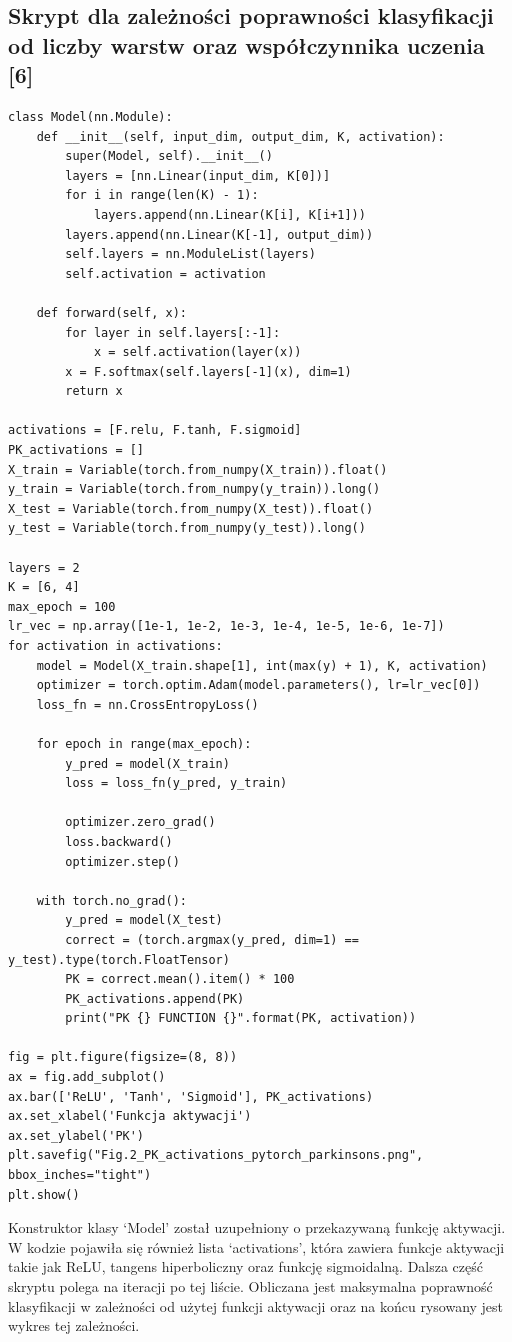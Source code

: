 \documentclass{article}
\begin{document}
\subsection{Skrypt dla zależności poprawności klasyfikacji od liczby warstw oraz współczynnika uczenia [6]}
\begin{verbatim}
class Model(nn.Module):
    def __init__(self, input_dim, output_dim, K, activation):
        super(Model, self).__init__()
        layers = [nn.Linear(input_dim, K[0])]
        for i in range(len(K) - 1):
            layers.append(nn.Linear(K[i], K[i+1]))
        layers.append(nn.Linear(K[-1], output_dim))
        self.layers = nn.ModuleList(layers)
        self.activation = activation

    def forward(self, x):
        for layer in self.layers[:-1]:
            x = self.activation(layer(x))
        x = F.softmax(self.layers[-1](x), dim=1)
        return x

activations = [F.relu, F.tanh, F.sigmoid]
PK_activations = []
X_train = Variable(torch.from_numpy(X_train)).float()
y_train = Variable(torch.from_numpy(y_train)).long()
X_test = Variable(torch.from_numpy(X_test)).float()
y_test = Variable(torch.from_numpy(y_test)).long()

layers = 2
K = [6, 4]
max_epoch = 100
lr_vec = np.array([1e-1, 1e-2, 1e-3, 1e-4, 1e-5, 1e-6, 1e-7])
for activation in activations:
    model = Model(X_train.shape[1], int(max(y) + 1), K, activation)
    optimizer = torch.optim.Adam(model.parameters(), lr=lr_vec[0])
    loss_fn = nn.CrossEntropyLoss()

    for epoch in range(max_epoch):
        y_pred = model(X_train)
        loss = loss_fn(y_pred, y_train)

        optimizer.zero_grad()
        loss.backward()
        optimizer.step()

    with torch.no_grad():
        y_pred = model(X_test)
        correct = (torch.argmax(y_pred, dim=1) == y_test).type(torch.FloatTensor)
        PK = correct.mean().item() * 100
        PK_activations.append(PK)
        print("PK {} FUNCTION {}".format(PK, activation))

fig = plt.figure(figsize=(8, 8))
ax = fig.add_subplot()
ax.bar(['ReLU', 'Tanh', 'Sigmoid'], PK_activations)
ax.set_xlabel('Funkcja aktywacji')
ax.set_ylabel('PK')
plt.savefig("Fig.2_PK_activations_pytorch_parkinsons.png", bbox_inches="tight")
plt.show()
\end{verbatim}

Konstruktor klasy `Model' został uzupełniony o przekazywaną funkcję aktywacji.
W kodzie pojawiła się również lista `activations', która zawiera funkcje aktywacji takie jak ReLU, tangens hiperboliczny oraz funkcję sigmoidalną.
Dalsza część skryptu polega na iteracji po tej liście.
Obliczana jest maksymalna poprawność klasyfikacji w zależności od użytej funkcji aktywacji oraz na końcu rysowany jest wykres tej zależności.
\end{document}
